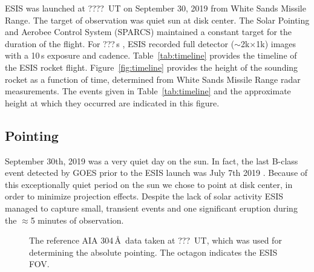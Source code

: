 		ESIS was launched at ????\rts{\timestart}~UT  on September 30, 2019 from White Sands Missile Range.  The target of observation was quiet sun at disk center.  The Solar Pointing and Aerobee Control System (SPARCS) maintained a constant target for the duration of the flight.  For ???\,s , ESIS recorded full detector ($\sim$2k$\times$1k) images with a 10\,s exposure and cadence. %
		Table~\ref{tab:timeline} provides the timeline of the ESIS rocket flight. Figure~\ref{fig:timeline} provides the height of the sounding rocket as a function of time, determined from White Sands Missile Range radar measurements.  The events given in Table~\ref{tab:timeline} and the approximate height at which they occurred are indicated in this figure.


	\subsection{Pointing} \label{sec:point}
		September 30th, 2019 was a very quiet day on the sun.  
		In fact, the last  B-class event detected by GOES \citep{GOES} prior to the ESIS launch was July 7th 2019 .  
		Because of this exceptionally quiet period on the sun we chose to point at disk center, in order to minimize projection effects.  
		Despite the lack of solar activity ESIS managed to capture  small, transient events and one significant eruption during the $\approx$5 minutes of observation.
		
		\begin{figure}[ht]
			\begin{center}
				\caption{The reference AIA 304\,\AA\ data taken at ???~UT, which was used for determining the absolute pointing. The octagon indicates the ESIS FOV.}
				\label{fig:fov}
			\end{center}
		\end{figure}
	
